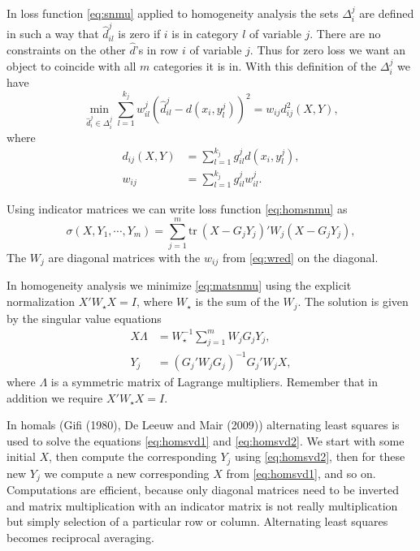 \documentclass[
  12pt,
]{article}
\begin{document}
In loss function \eqref{eq:snmu} applied to homogeneity analysis
the sets \(\Delta_i^j\) are defined in such a way that \(\hat d_{il}^j\) is zero if \(i\) is in category \(l\) of
variable \(j\). There are no constraints on the other \(\hat d\)'s in row \(i\)
of variable \(j\). Thus for zero loss we want an object to coincide with all \(m\) categories it is in. With this definition of the \(\Delta_i^j\) we have
\begin{equation}
\min_{\hat d_i^j\in\Delta_i^j}\sum_{l=1}^{k_j}w_{il}^j(\hat d_{il}^j-d(x_i,y_l^j))^2=w_{ij}d_{ij}^2(X,Y),
\label{eq:homsnmu}
\end{equation}
where
\begin{align}
d_{ij}(X,Y)&=\sum_{l=1}^{k_j}g_{il}^jd(x_i,y^j_l),\label{eq:dred}\\
w_{ij}&=\sum_{l=1}^{k_j}g_{il}^jw^j_{il}.\label{eq:wred}
\end{align}

Using indicator matrices we can write loss function \eqref{eq:homsnmu} as
\begin{equation}
\sigma(X,Y_1,\cdots,Y_m)=
\sum_{j=1}^m\text{tr}\ (X-G_jY_j)'W_j(X-G_jY_j),
\label{eq:matsnmu}
\end{equation}
The \(W_j\) are diagonal matrices with the \(w_{ij}\) from \eqref{eq:wred}
on the diagonal.

In homogeneity analysis we minimize \eqref{eq:matsnmu} using the
explicit normalization \(X'W_\star X=I\), where \(W_\star\) is the
sum of the \(W_j\). The solution is given by the singular value
equations
\begin{align}
X\Lambda&=W_\star^{-1}\sum_{j=1}^m W_jG_jY_j,\label{eq:homsvd1}\\
Y_j&=(G_j'W_jG_j)^{-1}G_j'W_jX,\label{eq:homsvd2}
\end{align}
where \(\Lambda\) is a symmetric matrix of Lagrange multipliers. Remember that in addition we require \(X'W_\star X=I\).

In homals (Gifi (1980), De Leeuw and Mair (2009)) alternating least squares is used
to solve the equations \eqref{eq:homsvd1} and \eqref{eq:homsvd2}. We start with
some initial \(X\), then compute the corresponding \(Y_j\) using \eqref{eq:homsvd2},
then for these new \(Y_j\) we compute a new corresponding \(X\) from \eqref{eq:homsvd1},
and so on. Computations are efficient, because only diagonal matrices need to
be inverted and matrix multiplication with an indicator matrix is not really multiplication but simply selection of a particular row or column. Alternating least squares becomes reciprocal averaging.
\end{document}
